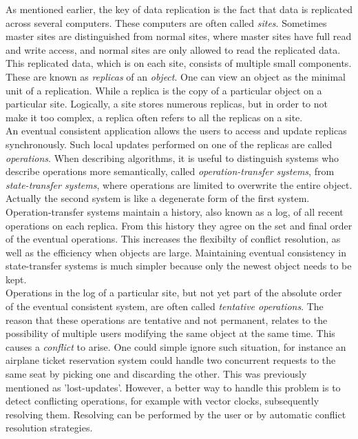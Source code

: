 \documentclass[a4paper,12pt]{report}
\begin{document}
As mentioned earlier, the key of data replication is the fact that data is replicated across several computers. These computers are often called \textit{sites}. Sometimes master sites are distinguished from normal sites, where master sites have full read and write access, and normal sites are only allowed to read the replicated data. This replicated data, which is on each site, consists of multiple small components. These are known as \textit{replicas} of an \textit{object}. One can view an object as the minimal unit of a replication. While a replica is the copy of a particular object on a particular site. Logically, a site stores numerous replicas, but in order to not make it too complex, a replica often refers to all the replicas on a site. \\
\indent An eventual consistent application allows the users to access and update replicas synchronously. Such local updates performed on one of the replicas are called \textit{operations}. When describing algorithms, it is useful to distinguish systems who describe operations more semantically, called \textit{operation-transfer systems}, from \textit{state-transfer systems}, where operations are limited to overwrite the entire object. Actually the second system is like a degenerate form of the first system. Operation-transfer systems maintain a history, also known as a log, of all recent operations on each replica. From this history they agree on the set and final order of the eventual operations. This increases the flexibilty of conflict resolution, as well as the efficiency when objects are large. Maintaining eventual consistency in state-transfer systems is much simpler because only the newest object needs to be kept. \\
\indent Operations in the log of a particular site, but not yet part of the absolute order of the eventual consistent system, are often called \textit{tentative operations}. The reason that these operations are tentative and not permanent, relates to the possibility of multiple users modifying the same object at the same time. This causes a \textit{conflict} to arise. One could simple ignore such situation, for instance an airplane ticket reservation system could handle two concurrent requests to the same seat by picking one and discarding the other. This was previously mentioned as 'lost-updates'. However, a better way to handle this problem is to detect conflicting operations, for example with vector clocks, subsequently resolving them. Resolving can be performed by the user or by automatic conflict resolution strategies. \\
\end{document}
